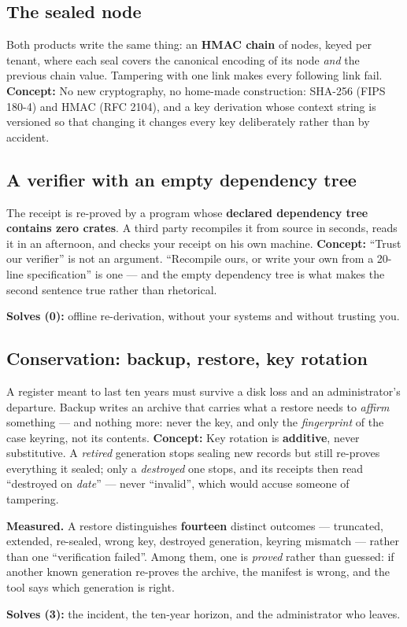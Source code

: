 \documentclass[11pt]{article}
\newcommand{\mesure}[1]{{\color{efeteal}\textbf{Measured.} }#1\par}
\newcommand{\concept}[1]{{\color{efenavy}\textbf{Concept:} }#1\par}
\newcommand{\solves}[2]{{\color{efesolve}\textbf{Solves #1:} }#2\par}
\begin{document}
\subsection{The sealed node}
Both products write the same thing: an \textbf{HMAC chain} of nodes, keyed per tenant, where each
seal covers the canonical encoding of its node \emph{and} the previous chain value. Tampering with
one link makes every following link fail.
\concept{No new cryptography, no home-made construction: SHA-256 (FIPS 180-4) and HMAC (RFC 2104),
and a key derivation whose context string is versioned so that changing it changes every key
deliberately rather than by accident.}

\subsection{A verifier with an empty dependency tree}
The receipt is re-proved by a program whose \textbf{declared dependency tree contains zero crates}.
A third party recompiles it from source in seconds, reads it in an afternoon, and checks your receipt
on his own machine.
\concept{``Trust our verifier'' is not an argument. ``Recompile ours, or write your own from a
20-line specification'' is one --- and the empty dependency tree is what makes the second sentence
true rather than rhetorical.}
\solves{(0)}{offline re-derivation, without your systems and without trusting you.}

\subsection{Conservation: backup, restore, key rotation}
A register meant to last ten years must survive a disk loss and an administrator's departure. Backup
writes an archive that carries what a restore needs to \emph{affirm} something --- and nothing more:
never the key, and only the \emph{fingerprint} of the case keyring, not its contents.
\concept{Key rotation is \textbf{additive}, never substitutive. A \emph{retired} generation stops
sealing new records but still re-proves everything it sealed; only a \emph{destroyed} one stops, and
its receipts then read ``destroyed on \emph{date}'' --- never ``invalid'', which would accuse someone
of tampering.}
\mesure{A restore distinguishes \textbf{fourteen} distinct outcomes --- truncated, extended,
re-sealed, wrong key, destroyed generation, keyring mismatch --- rather than one ``verification
failed''. Among them, one is \emph{proved} rather than guessed: if another known generation re-proves
the archive, the manifest is wrong, and the tool says which generation is right.}
\solves{(3)}{the incident, the ten-year horizon, and the administrator who leaves.}
\end{document}
